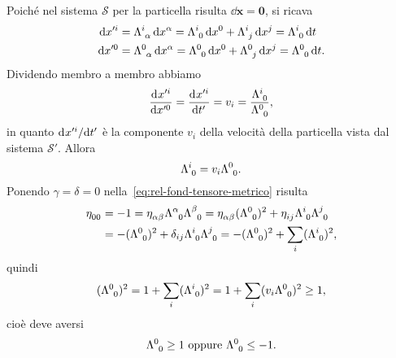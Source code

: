 Poiché nel sistema $\mathcal{S}$ per la particella risulta $\dd\bm{x} = \bm{0}$,
si ricava
\begin{subequations}
  \begin{align}
    \dd x'^{i} &= \tensor{\Lambda}{^{i}_{\alpha}}\dd x^{\alpha} =
    \tensor{\Lambda}{^{i}_{0}}\dd x^{0} + \tensor{\Lambda}{^{i}_{j}}\dd x^{j} =
    \tensor{\Lambda}{^{i}_{0}}\dd t \\
    \dd x'^{0} &= \tensor{\Lambda}{^{0}_{\alpha}}\dd x^{\alpha} =
    \tensor{\Lambda}{^{0}_{0}}\dd x^{0} + \tensor{\Lambda}{^{0}_{j}}\dd x^{j} =
    \tensor{\Lambda}{^{0}_{0}}\dd t.
  \end{align}
\end{subequations}
Dividendo membro a membro abbiamo
\begin{equation}
  \toder{x'^{i}}{x'^{0}} = \toder{x'^{i}}{t'} = v_{i} =
  \frac{\tensor{\Lambda}{^{i}_{0}}}{\tensor{\Lambda}{^{0}_{0}}},
\end{equation}
in quanto $\mathrm{d}^{}x'^{i} / \mathrm{d} {t'}^{}$ è la componente $v_{i}$ della velocità della
particella vista dal sistema $\mathcal{S}'$.  Allora
\begin{equation}
  \tensor{\Lambda}{^{i}_{0}} = v_{i}\tensor{\Lambda}{^{0}_{0}}.
\end{equation}
Ponendo $\gamma = \delta = 0$ nella~\eqref{eq:rel-fond-tensore-metrico} risulta
\begin{equation}
  \begin{split}
    \tensor{\eta}{_{00}} &= -1 = \tensor{\eta}{_{\alpha\beta}}
    \tensor{\Lambda}{^{\alpha}_{0}} \tensor{\Lambda}{^{\beta}_{0}} =
    \tensor{\eta}{_{\alpha\beta}}(\tensor{\Lambda}{^{0}_{0}})^{2} +
    \tensor{\eta}{_{ij}} \tensor{\Lambda}{^{i}_{0}} \tensor{\Lambda}{^{j}_{0}}
    \\
    &= -(\tensor{\Lambda}{^{0}_{0}})^{2} + \delta_{ij}
    \tensor{\Lambda}{^{i}_{0}} \tensor{\Lambda}{^{j}_{0}} =
    -(\tensor{\Lambda}{^{0}_{0}})^{2}+\sum_{i}(\tensor{\Lambda}{^{i}_{0}})^{2},
  \end{split}
\end{equation}
quindi
\begin{equation}
  (\tensor{\Lambda}{^{0}_{0}})^{2} = 1 +
  \sum_{i}(\tensor{\Lambda}{^{i}_{0}})^{2} = 1 +
  \sum_{i}(v_{i}\tensor{\Lambda}{^{0}_{0}})^{2} \geq 1,
\end{equation}
cioè deve aversi
\begin{equation}
  \tensor{\Lambda}{^{0}_{0}} \geq 1 \text{ oppure } \tensor{\Lambda}{^{0}_{0}}
  \leq -1.
\end{equation}
